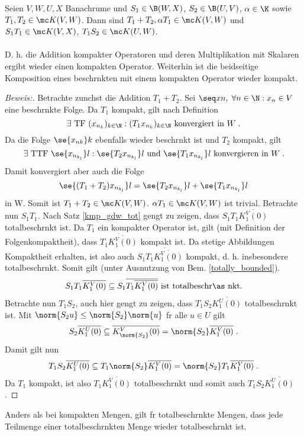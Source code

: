 \begin{theorem}
	\label{composition_compact_bounded}
	Seien \(V,W, U, X\) Banachr\as ume und  \(S_1\in \B(W,X)\), \(S_2\in \B(U,V)\), \;\(\alpha \in \K\) sowie \(T_1, T_2\in \mc K(V,W)\). Dann sind \(T_1 + T_2, \alpha T_1 \in \mc K(V,W)\) und \(S_1 T_1\in \mc K(V,X)\), \(T_1S_2\in \mc K(U,W)\). \\ \\  D. h. die Addition kompakter Operatoren und deren Multiplikation mit Skalaren ergibt wieder einen kompakten Operator. Weiterhin ist die beidseitige Komposition eines beschr\as nkten mit einem kompakten Operator wieder kompakt.
\end{theorem}
\begin{proof}[Beweis:]
	Betrachte zun\as chst die Addition \(T_1 + T_2\). Sei \(\seq xn,\; \forall n\in\N: x_n \in V\) eine beschr\as nkte Folge. Da $T_1$ kompakt, gilt nach Definition
	\[\exists \text{ TF } (x_{n_k})_{k\in\N}: (T_1 x_{n_k})_{k\in\N} \text{ konvergiert in } W\;.\]
	Da die Folge \(\se {x_{nk}}k\) ebenfalls wieder beschr\as nkt ist und $T_2$ kompakt, gilt
	\[\exists\text{ TTF } \se {x_{n_{k_l}}}l:  \se { T_2 x_{n_{k_l}}}l \text{ und } \se {T_ 1x_{n_{k_l}}}l \text{ konvergieren in }W \;.\]
	Damit konvergiert aber auch die Folge
	\[\se {(T_1 + T_2) x_{n_{k_l}}}l = \se { T_2 x_{n_{k_l}}}l + \se {T_ 1x_{n_{k_l}}}l \]
	in W. Somit ist \(T_1 + T_2 \in \mc K(V,W)\). \(\alpha T_1 \in \mc K(V,W)\) ist trivial. Betrachte nun \(S_1 T_1\). Nach Satz \ref{kmp_gdw_tot}  gen\us gt zu zeigen, dass \(S_1 T_1 \overline{K_1^V(0)}\) totalbeschr\as nkt ist. Da $T_1$ ein kompakter Operator ist, gilt (mit Definition der Folgenkompaktheit), dass \(\overline{T_1\overline{K_1^V(0)}}\) kompakt ist. Da stetige Abbildungen Kompaktheit erhalten, ist also auch \(S_1 \overline{T_1\overline{K_1^V(0)}}\) kompakt, d. h. insbesondere totalbeschr\as nkt. Somit gilt (unter Ausnutzung von Bem. \ref{totally_bounded}).
	\[S_1 T_1 \overline{K_1^V(0)} \subseteq S_1\overline{T_1\overline{K_1^V(0)}} \text{ ist totalbeschr\as nkt.}\]
	Betrachte nun \(T_1S_2\), auch hier gen\us gt zu zeigen, dass \(T_1S_2 \overline{K_1^U(0)}\) totalbeschr\as nkt ist. Mit \(\norm {S_2 u} \leq \norm{S_2}\norm{u}\) f\us r alle \(u\in U\) gilt
	\[S_2 \overline{K_1^U(0)} \subseteq \overline{K_{\norm{S_2}}^V(0)} = \norm{S_2} \overline{K_1^V(0)}\;.\]
	Damit gilt nun 
	\[T_1S_2 \overline{K_1^U(0)} \subseteq T_1\norm{S_2} \overline{K_1^V(0)} = \norm{S_2} T_1\overline{K_1^V(0)}\;.\]
	Da $T_1$ kompakt, ist also \(T_1 \overline{K_1^V(0)}\) totalbeschr\as nkt und somit auch \(T_1S_2\overline{K_1^U(0)}\).
\end{proof}
\begin{rem}
	\label{totally_bounded}
	Anders als bei kompakten Mengen, gilt f\us r totalbeschr\as nkte Mengen, dass jede Teilmenge einer totalbeschr\as nkten Menge wieder totalbeschr\as nkt ist.
\end{rem}

